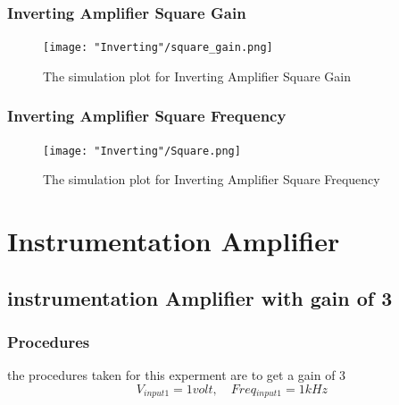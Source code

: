\documentclass{article}
\begin{document}
	\subsubsection{Inverting Amplifier Square Gain}
	\begin{figure}[H]
	
	\centering
	\texttt{[image: "Inverting"/square\_gain.png]}
	\caption{The simulation plot for Inverting Amplifier Square Gain}
	\label{fig:inv_square_gain}
	\end{figure}
	\subsubsection{Inverting Amplifier Square Frequency}
	
	\begin{figure}[H]
	
	\centering
	\texttt{[image: "Inverting"/Square.png]}
	\caption{The simulation plot for Inverting Amplifier Square Frequency}
	\label{fig:inv_SquareFreq}
	\end{figure}
	
	
	
	
	\section{Instrumentation Amplifier}
	\subsection{instrumentation Amplifier with gain of 3}
	\subsubsection{Procedures}
	
	the procedures taken for this experment are to get a gain of 3
	\begin{equation}
	V{_{input1}} = 1 { volt}, \quad {Freq}{_{input1}} = 1 {kHz}
	\end{equation}
	
\end{document}
